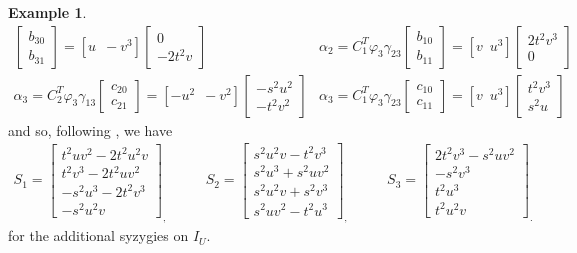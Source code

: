\documentclass[reqno]{amsart}
\numberwithin{equation}{section}
\theoremstyle{definition}
\newtheorem{ex}[thm]{Example}
\begin{document}
\begin{ex}
\[\begin{array}{ll}
\begin{bmatrix}
b_{30}\\
b_{31}
\end{bmatrix}=[u \,\,\,-v^3 ]\begin{bmatrix}
0\\
-2t^2v
\end{bmatrix}
& \alpha_2 =C_1^T \varphi_3\gamma_{23}\begin{bmatrix}
 b_{10}\\
b_{11}
\end{bmatrix}=[ v\,\,\,u^3 ]\begin{bmatrix}
2t^2v^3\\
0
\end{bmatrix}\\[4ex]
\alpha_3 =C_2^T \varphi_3\gamma_{13}\begin{bmatrix}
c_{20}\\
c_{21}
\end{bmatrix} = [ -u^2\,\,\,-v^2 ]\begin{bmatrix}
-s^2u^2\\
-t^2v^2
\end{bmatrix}
&\alpha_3=C_1^T \varphi_3\gamma_{23}\begin{bmatrix}
c_{10}\\
c_{11}
\end{bmatrix}=[ v\,\,\,u^3 ]\begin{bmatrix}
t^2v^3\\
s^2u
\end{bmatrix}
\end{array}
\]
and so, following , we have
\[\begin{array}{ccc}
S_1 = \begin{bmatrix}
t^2uv^2-2t^2u^2v\\
t^2v^3-2t^2uv^2\\
-s^2u^3-2t^2v^3\\
-s^2u^2v
\end{bmatrix}_,\quad\quad
& S_2 = \begin{bmatrix}
 s^2u^2v - t^2v^3\\
 s^2u^3+s^2uv^2\\
 s^2u^2v+s^2v^3\\
 s^2uv^2-t^2u^3
\end{bmatrix}_,
\quad\quad
&S_3=\begin{bmatrix}
 2t^2v^3-s^2uv^2\\
 -s^2v^3\\
 t^2u^3\\
 t^2u^2v
\end{bmatrix}_.
\end{array}
\]
for the additional syzygies on $I_U$.


\end{ex}
\end{document}
